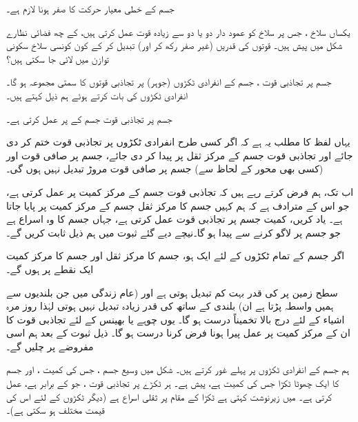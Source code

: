 جسم کے  خطی معیار حرکت   کا صفر ہونا لازم ہے۔

یکساں سلاخ ، جس پر سلاخ کو عمود دار دو یا دو سے زیادہ قوت عمل کرتی ہیں،  کے چھ فضائی نظارے شکل  میں پیش ہیں۔ قوتوں کی قدریں      (غیر صفر رکھ کر اور)   تبدیل کر کے  کون کونسی سلاخ سکونی توازن میں لائی جا سکتی ہیں؟

جسم پر تجاذبی قوت  ، جسم کے انفرادی ٹکڑوں (جوہر) پر تجاذبی قوتوں کا سمتی مجموعہ ہو گا۔ انفرادی ٹکڑوں کی بات کرتے ہوئے ہم ذیل کہتے ہیں۔

جسم پر تجاذبی قوت     جسم کے  پر    عمل کرتی ہے۔

یہاں لفظ  کا مطلب یہ ہے کہ  اگر کسی طرح انفرادی ٹکڑوں  پر تجاذبی قوت ختم کر دی جائے اور تجاذبی قوت   جسم کے مرکز ثقل پر پیدا کر دی جائے، جسم پر صافی قوت اور  (کسی بھی محور کے لحاظ سے)  جسم پر صافی قوت مروڑ تبدیل نہیں ہوں گی۔

اب تک،  ہم فرض کرتے رہے ہیں کہ تجاذبی قوت   جسم کے مرکز کمیت پر عمل کرتی ہے، جو   اس  کے  مترادف  ہے  کہ ہم کہیں جسم کا مرکز ثقل  جسم کے مرکز کمیت  پر پایا جاتا ہے۔ یاد  کریں، کمیت    جسم پر تجاذبی  قوت      عمل کرتی ہے، جہاں    جسم کا وہ اسراع ہے جو جسم پر  لاگو کرنے سے پیدا ہو گا۔نیچے دیے گئے  ثبوت میں ہم ذیل ثابت کریں گے۔

اگر جسم کے تمام ٹکڑوں کے لئے   ایک ہو، جسم کا مرکز ثقل اور جسم کا مرکز کمیت ایک نقطے پر ہوں گے۔

سطح زمین پر  کی قدر بہت کم تبدیل ہوتی ہے اور  (عام زندگی میں جن بلندیوں سے  ہمیں واسطہ پڑتا ہے ان) بلندی کے ساتھ   کی قدر زیادہ تبدیل نہیں ہوتی  لہٰذا روز مرہ اشیاء  کے لئے  درج بالا تخمیناً درست ہو گا۔ یوں  چوہے یا بھینس  کے لئے تجاذبی قوت کا   ان کے مرکز کمیت پر عمل پیرا   ہونا  فرض کرنا درست ہو گا۔ ذیل ثبوت کے بعد ہم اسی مفروضے پر چلیں گے۔

ہم  جسم کے انفرادی ٹکڑوں پر  پہلے غور کرتے ہیں۔ شکل  میں  وسیع جسم  ، جس کی کمیت  ، اور   جسم کا ایک چھوٹا ٹکڑا جس کی کمیت  ہے، پیش ہے۔ ہر ٹکڑے پر تجاذبی قوت ،   جو  کے برابر ہے، عمل کرتی ہے۔  میں زیرنوشت کہتی ہے    ٹکڑا کے مقام پر ثقلی اسراع ہے  (دیگر ٹکڑوں کے لئے اس کی قیمت مختلف ہو سکتی ہے)۔

